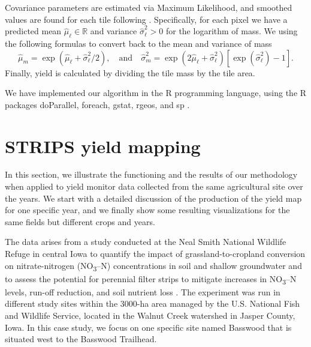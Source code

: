 \documentclass[12pt]{article}
\begin{document}
Covariance parameters are estimated via Maximum Likelihood, and
smoothed values are found for each tile following \cite{Cressie1993}.
Specifically, for each pixel we have a predicted mean
$\hat\mu_{\ell} \in \mathbb{R}$ and variance
$\hat\sigma^2_{\ell} > 0$ for the logarithm of mass.  We using the
following formulas to convert back to the mean and variance of mass
\[ \hat{\mu}_{m} = \exp\left(\hat{\mu}_{\ell} +
\hat{\sigma}^2_{\ell}/2\right), \quad\mbox{and}\quad
\hat{\sigma}^2_{m} = \exp\left(2 \hat{\mu}_{\ell} +
\hat{\sigma}^2_{\ell}\right)
\left[\exp\left(\hat{\sigma}^2_{\ell}\right) - 1\right].
 \] Finally, yield is calculated by dividing the tile mass by the tile
area.

We have implemented our algorithm in the R programming language, using
the R packages doParallel, foreach, gstat, rgeos, and sp
\citep{Pebesma2004, Pebesma2005, Bivand2013, Graeler2016,
  Microsoft2017, Corporation2018, RCT2019, Bivand2019}.

\section{STRIPS yield mapping}

In this section, we illustrate the
functioning and the results of our methodology when applied to yield
monitor data collected from the same agricultural site over the
years. We start with a detailed discussion of the production of the
yield map for one specific year, and we finally show some resulting
visualizations for the same fields but different crops and years.

The data arises from a study
conducted at the Neal Smith National Wildlife Refuge in central Iowa
to quantify the impact of grassland-to-cropland conversion on
nitrate-nitrogen (NO\textsubscript{3}–N) concentrations in soil and
shallow groundwater and to assess the potential for perennial filter
strips to mitigate increases in NO\textsubscript{3}–N levels, run-off
reduction, and soil nutrient loss \citep{Zhou2010}. The experiment was
run in different study sites within the 3000-ha area managed by the
U.S. National Fish and Wildlife Service, located in the Walnut Creek
watershed in Jasper County, Iowa. In this case study, we focus on one
specific site named Basswood that is situated west to the Basswood
Trailhead.
\end{document}
